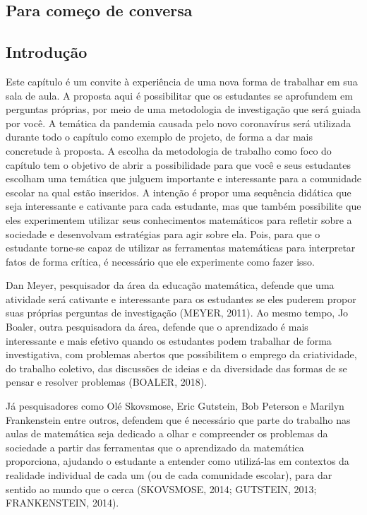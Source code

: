 \begin{apresentacao}
\section{Para começo de conversa}
\subsection{Introdução}

Este capítulo é um convite à experiência de uma nova forma de trabalhar em sua sala de aula. A proposta aqui é possibilitar que os estudantes se aprofundem em perguntas próprias, por meio de uma metodologia de investigação que será guiada por você. A temática da pandemia causada pelo novo coronavírus será utilizada durante todo o capítulo como exemplo de projeto, de forma a dar mais concretude à proposta. A escolha da metodologia de trabalho como foco do capítulo tem o objetivo de abrir a possibilidade para que você e seus estudantes escolham uma temática que julguem importante e interessante para a comunidade escolar na qual estão inseridos. A intenção é propor uma sequência didática que seja interessante e cativante para cada estudante, mas que também possibilite que eles experimentem utilizar seus conhecimentos matemáticos para refletir sobre a sociedade e desenvolvam estratégias para agir sobre ela. Pois, para que o estudante torne-se capaz de utilizar as ferramentas matemáticas para interpretar fatos de forma crítica, é necessário que ele experimente como fazer isso. 

Dan Meyer, pesquisador da área da educação matemática, defende que uma atividade será cativante e interessante para os estudantes se eles puderem propor suas próprias perguntas de investigação (MEYER, 2011). Ao mesmo tempo, Jo Boaler, outra pesquisadora da área, defende que o aprendizado é mais interessante e mais efetivo quando os estudantes podem trabalhar de forma investigativa, com problemas abertos que possibilitem o emprego da criatividade, do trabalho coletivo, das discussões de ideias e da diversidade das formas de se pensar e resolver problemas (BOALER, 2018).

Já pesquisadores como Olé Skovsmose, Eric Gutstein, Bob Peterson e Marilyn Frankenstein entre outros, defendem que é necessário que parte do trabalho nas aulas de matemática seja dedicado a olhar e compreender os problemas da sociedade a partir das ferramentas que o aprendizado da matemática proporciona, ajudando o estudante a entender como utilizá-las em contextos da realidade individual de cada um (ou de cada comunidade escolar), para dar sentido ao mundo que o cerca (SKOVSMOSE, 2014; GUTSTEIN, 2013; FRANKENSTEIN, 2014).


\end{apresentacao}
